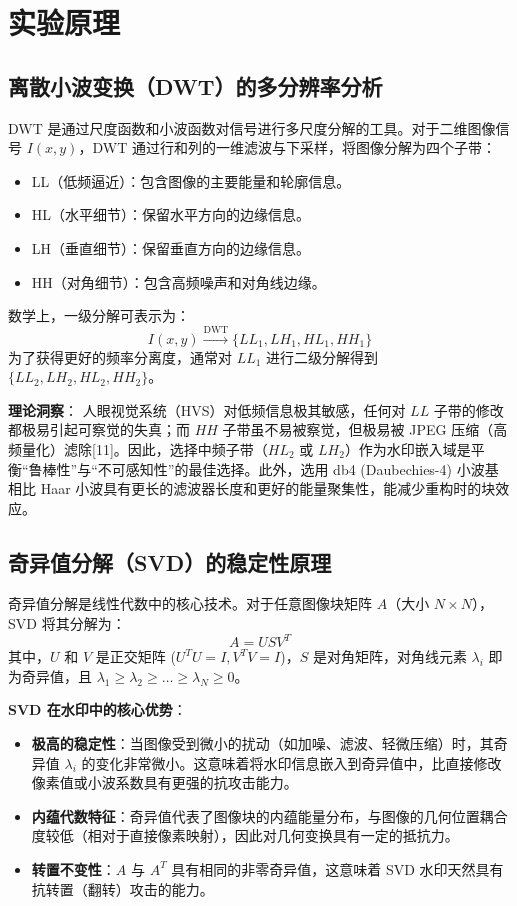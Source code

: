 \documentclass[zihao=-4, a4paper]{ctexart} %
\begin{document}
	\section{实验原理}
	
	\subsection{离散小波变换（DWT）的多分辨率分析}
	DWT 是通过尺度函数和小波函数对信号进行多尺度分解的工具。对于二维图像信号 $I(x, y)$，DWT 通过行和列的一维滤波与下采样，将图像分解为四个子带：
	\begin{itemize}
		\item LL（低频逼近）：包含图像的主要能量和轮廓信息。
		\item HL（水平细节）：保留水平方向的边缘信息。
		\item LH（垂直细节）：保留垂直方向的边缘信息。
		\item HH（对角细节）：包含高频噪声和对角线边缘。
	\end{itemize}
	数学上，一级分解可表示为：
	\begin{equation}
		I(x,y) \xrightarrow{\text{DWT}} \{LL_1, LH_1, HL_1, HH_1\}
	\end{equation}
	为了获得更好的频率分离度，通常对 $LL_1$ 进行二级分解得到 $\{LL_2, LH_2, HL_2, HH_2\}$。
	
	\textbf{理论洞察}：
	人眼视觉系统（HVS）对低频信息极其敏感，任何对 $LL$ 子带的修改都极易引起可察觉的失真；而 $HH$ 子带虽不易被察觉，但极易被 JPEG 压缩（高频量化）滤除[11]。因此，选择中频子带（$HL_2$ 或 $LH_2$）作为水印嵌入域是平衡“鲁棒性”与“不可感知性”的最佳选择。此外，选用 db4 (Daubechies-4) 小波基相比 Haar 小波具有更长的滤波器长度和更好的能量聚集性，能减少重构时的块效应。
	
	\subsection{奇异值分解（SVD）的稳定性原理}
	奇异值分解是线性代数中的核心技术。对于任意图像块矩阵 $A$（大小 $N \times N$），SVD 将其分解为：
	\begin{equation}
		A = U S V^T
	\end{equation}
	其中，$U$ 和 $V$ 是正交矩阵 ($U^T U = I, V^T V = I$)，$S$ 是对角矩阵，对角线元素 $\lambda_i$ 即为奇异值，且 $\lambda_1 \ge \lambda_2 \ge \dots \ge \lambda_N \ge 0$。
	
	\textbf{SVD 在水印中的核心优势}：
	\begin{itemize}
		\item \textbf{极高的稳定性}：当图像受到微小的扰动（如加噪、滤波、轻微压缩）时，其奇异值 $\lambda_i$ 的变化非常微小。这意味着将水印信息嵌入到奇异值中，比直接修改像素值或小波系数具有更强的抗攻击能力。
		\item \textbf{内蕴代数特征}：奇异值代表了图像块的内蕴能量分布，与图像的几何位置耦合度较低（相对于直接像素映射），因此对几何变换具有一定的抵抗力。
		\item \textbf{转置不变性}：$A$ 与 $A^T$ 具有相同的非零奇异值，这意味着 SVD 水印天然具有抗转置（翻转）攻击的能力。
	\end{itemize}
	
\end{document}
